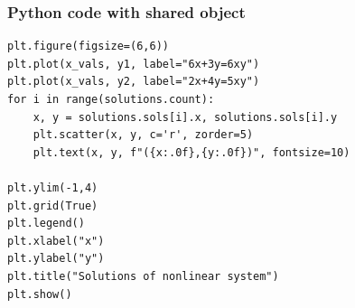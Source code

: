 \documentclass{beamer}
\begin{document}
\begin{frame}[fragile]
\frametitle{Python code with shared object}
\begin{lstlisting}
plt.figure(figsize=(6,6))
plt.plot(x_vals, y1, label="6x+3y=6xy")
plt.plot(x_vals, y2, label="2x+4y=5xy")
for i in range(solutions.count):
    x, y = solutions.sols[i].x, solutions.sols[i].y
    plt.scatter(x, y, c='r', zorder=5)
    plt.text(x, y, f"({x:.0f},{y:.0f})", fontsize=10)

plt.ylim(-1,4)
plt.grid(True)
plt.legend()
plt.xlabel("x")
plt.ylabel("y")
plt.title("Solutions of nonlinear system")
plt.show()


\end{lstlisting}
\end{frame}
\end{document}
